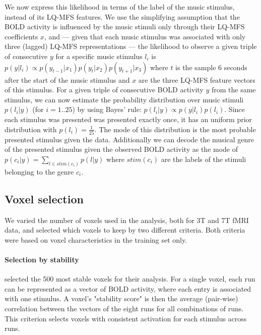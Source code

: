 We now express this likelihood in terms of the label of the music stimulus, instead of its LQ-MFS features.  We
use the simplifying assumption that the BOLD activity is influenced by the
music stimuli only through their LQ-MFS coefficients $x$, and --- given that
each music stimulus was associated with only three (lagged) LQ-MFS
representations --- the likelihood to observe a given triple of consecutive $y$
for a specific music stimulus $l_{i}$ is $p(y|l_{i}) \propto
p(y_{t-1}|x_{1})p(y_{t}|x_{2})p(y_{t+1}|x_{3})$ where $t$ is the sample 6
seconds after the start of the music stimulus and $x$ are the three LQ-MFS
feature vectors of this stimulus.  For a given triple of consecutive BOLD
activity $y$ from the same stimulus, we can now estimate the probability
distribution over music stimuli $p(l_{i}|y)$ (for $i=1..25$) by using Bayes'
rule: $p(l_{i}|y) \propto p(y|l_{i})p(l_{i})$.
Since each stimulus was presented was presented exactly once,
it has an uniform prior distribution with $p(l_{i})=\frac{1}{25}$. The mode of
this distribution is the most probable presented stimulus given the data. 
Additionally we can decode the musical genre of the presented stimulus given the observed
BOLD activity as the mode of $p(c_{i}|y) = \sum\nolimits_{l \in
  stim(c_{i})} p(l|y)$ where $stim(c_{i})$ are the labels of the stimuli
  belonging to the genre $c_{i}$. 


\subsection*{Voxel selection}

We varied the number of voxels used in the analysis, both for 3T and 7T
f{MRI} data, and selected which voxels to keep by two different criteria. Both
criteria were based on voxel characteristics in the training set only.

\paragraph{Selection by stability}

\citet{ML08} selected the 500 most stable voxels for their analysis. For a
single voxel, each run can be represented as a vector of BOLD activity, where
each entry is associated with one stimulus. A voxel's "stability score" is then
the average (pair-wise) correlation between the vectors of the eight runs for
all combinations of runs.  This criterion selects voxels with consistent
activation for each stimulus across runs.

